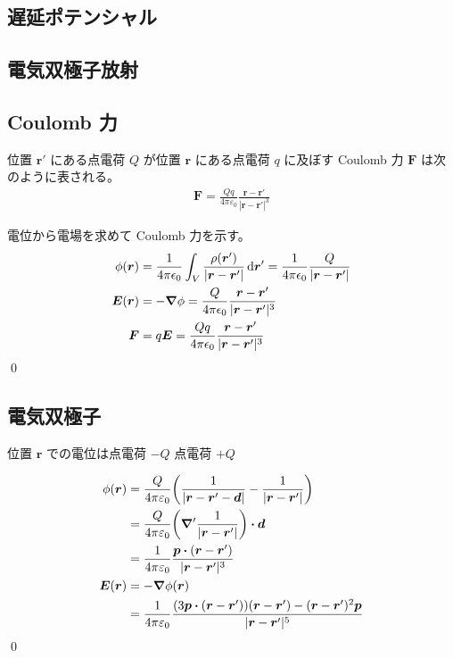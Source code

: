 \documentclass[uplatex,dvipdfmx,a4paper,11pt]{jlreq}
\makeatletter
\newcommand{\EE}{\bm{E}}
\newcommand{\rr}{\bm{r}}
\newcommand{\pp}{\bm{p}}
\theoremstyle{definition}
\renewenvironment{proof}[1][\proofname]{\par
  \normalfont
  \topsep6\p@\@plus6\p@ \trivlist
  \item[\hskip\labelsep{\bfseries #1}\@addpunct{\bfseries}]\ignorespaces\quad\par
}{%
  \qed\endtrivlist\@endpefalse
}
\renewcommand\proofname{証明}
\makeatother
\begin{document}
\subsection{遅延ポテンシャル}
\subsection{電気双極子放射}

\subsection{Coulomb 力}
\begin{theorem}
  位置 $\rr'$ にある点電荷 $Q$ が位置 $\rr$ にある点電荷 $q$ に及ぼす Coulomb 力 $\bm{F}$ は次のように表される。
  \begin{align}
    \bm{F} = \frac{Qq}{4\pi\varepsilon_0}\frac{\rr - \rr'}{|\rr - \rr'|^3}
  \end{align}
\end{theorem}
\begin{proof}
  電位から電場を求めて Coulomb 力を示す。
  \begin{align}
    \phi(\rr) & = \frac{1}{4\pi\epsilon_0}\int_V\frac{\rho(\rr')}{|\rr - \rr'|}\dd{\rr'} = \frac{1}{4\pi\epsilon_0}\frac{Q}{|\rr - \rr'|} \\
    \EE(\rr)  & = -\vnabla\phi = \frac{Q}{4\pi\epsilon_0}\frac{\rr - \rr'}{|\rr - \rr'|^3}                                                \\
    \bm{F}    & = q\EE = \frac{Qq}{4\pi\epsilon_0}\frac{\rr - \rr'}{|\rr - \rr'|^3}
  \end{align}
\end{proof}

\subsection{電気双極子}
\begin{proposition}[電気双極子]
  位置 $\rr$ での電位は点電荷 $-Q$ 点電荷 $+Q$
\end{proposition}
\begin{proof}
  \begin{align}
    \phi(\rr) & = \frac{Q}{4\pi\varepsilon_0}\qty(\frac{1}{|\rr - \rr' - \bm{d}|} - \frac{1}{|\rr - \rr'|})                     \\
              & = \frac{Q}{4\pi\varepsilon_0}\qty(\vnabla'\frac{1}{|\rr - \rr'|})\vdot\bm{d}                                    \\
              & = \frac{1}{4\pi\varepsilon_0}\frac{\pp\vdot(\rr - \rr')}{|\rr - \rr'|^3}                                        \\
    \EE(\rr)  & = -\vnabla\phi(\rr)                                                                                             \\
              & = \frac{1}{4\pi\varepsilon_0}\frac{\qty(3\pp\vdot(\rr - \rr'))(\rr - \rr') - (\rr - \rr')^2\pp}{|\rr - \rr'|^5}
  \end{align}
\end{proof}
\end{document}
